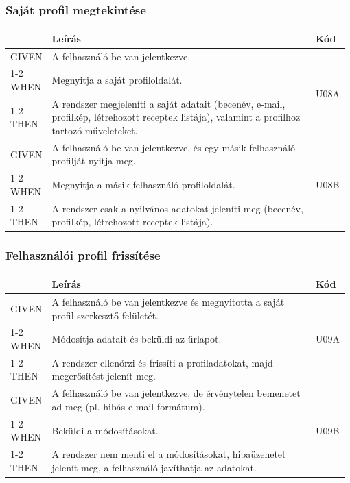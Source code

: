 \subsubsection{Saját profil megtekintése}
\begin{table}[H]
	\centering
	\begin{tabular}{|m{0.12\linewidth}|m{0.78\linewidth}|m{0.08\linewidth}|}
		\hline
		& \textbf{Leírás} & \textbf{Kód} \\\hline
		GIVEN & A felhasználó be van jelentkezve. & \multirow{3}{*}{U08A} \\\cline{1-2}
		WHEN  & Megnyitja a saját profiloldalát. & \\\cline{1-2}
		THEN  & A rendszer megjeleníti a saját adatait (becenév, e-mail, profilkép, létrehozott receptek listája), valamint a profilhoz tartozó műveleteket. & \\\hline

		GIVEN & A felhasználó be van jelentkezve, és egy másik felhasználó profilját nyitja meg. & \multirow{3}{*}{U08B} \\\cline{1-2}
		WHEN  & Megnyitja a másik felhasználó profiloldalát. & \\\cline{1-2}
		THEN  & A rendszer csak a nyilvános adatokat jeleníti meg (becenév, profilkép, létrehozott receptek listája). & \\\hline
	\end{tabular}
\end{table}

\subsubsection{Felhasználói profil frissítése}
\begin{table}[H]
	\centering
	\begin{tabular}{|m{0.12\linewidth}|m{0.78\linewidth}|m{0.08\linewidth}|}
		\hline
		& \textbf{Leírás} & \textbf{Kód} \\\hline
		GIVEN & A felhasználó be van jelentkezve és megnyitotta a saját profil szerkesztő felületét. & \multirow{3}{*}{U09A} \\\cline{1-2}
		WHEN  & Módosítja adatait és beküldi az űrlapot. & \\\cline{1-2}
		THEN  & A rendszer ellenőrzi és frissíti a profiladatokat, majd megerősítést jelenít meg. & \\\hline

		GIVEN & A felhasználó be van jelentkezve, de érvénytelen bemenetet ad meg (pl. hibás e-mail formátum). & \multirow{3}{*}{U09B} \\\cline{1-2}
		WHEN  & Beküldi a módosításokat. & \\\cline{1-2}
		THEN  & A rendszer nem menti el a módosításokat, hibaüzenetet jelenít meg, a felhasználó javíthatja az adatokat. & \\\hline
	\end{tabular}
\end{table}

